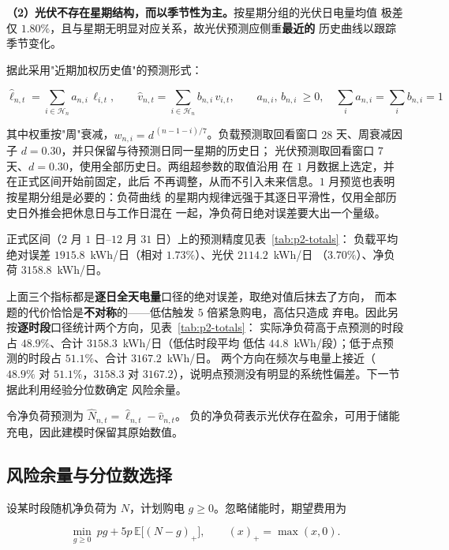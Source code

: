 \documentclass[withoutpreface,bwprint]{cumcmthesis}
\begin{document}
\textbf{（2）光伏不存在星期结构，而以季节性为主。}按星期分组的光伏日电量均值
极差仅 $1.80\%$，且与星期无明显对应关系，故光伏预测应侧重\textbf{最近的}
历史曲线以跟踪季节变化。

据此采用"近期加权历史值"的预测形式：

\begin{equation}
  \widehat{\ell}_{n,t}=\sum_{i\in\mathcal{H}_n}a_{n,i}\,\ell_{i,t},
  \qquad
  \widehat{v}_{n,t}=\sum_{i\in\mathcal{H}_n}b_{n,i}\,v_{i,t},
  \qquad
  a_{n,i},\,b_{n,i}\ \ge 0,\quad \sum_i a_{n,i}=\sum_i b_{n,i}=1
  \label{eq:p2-forecast}
\end{equation}

其中权重按"周"衰减，$w_{n,i}=d^{\,(n-1-i)/7}$。负载预测取回看窗口
$28$ 天、周衰减因子 $d=0.30$，并只保留与待预测日同一星期的历史日；
光伏预测取回看窗口 $7$ 天、$d=0.30$，使用全部历史日。两组超参数的取值沿用
在 $1$ 月数据上选定，并在正式区间开始前固定，此后
不再调整，从而不引入未来信息。$1$ 月预览也表明按星期分组是必要的：负荷曲线
的星期内规律远强于其逐日平滑性，仅用全部历史日外推会把休息日与工作日混在
一起，净负荷日绝对误差要大出一个量级。

正式区间（$2$ 月 $1$ 日--$12$ 月 $31$ 日）上的预测精度见表~\ref{tab:p2-totals}：
负载平均绝对误差 $1915.8$~kWh/日（相对 $1.73\%$）、光伏 $2114.2$~kWh/日
（$3.70\%$）、净负荷 $3158.8$~kWh/日。

上面三个指标都是\textbf{逐日全天电量}口径的绝对误差，取绝对值后抹去了方向，
而本题的代价恰恰是\textbf{不对称}的——低估触发 $5$ 倍紧急购电，高估只造成
弃电。因此另按\textbf{逐时段}口径统计两个方向，见表~\ref{tab:p2-totals}：
实际净负荷高于点预测的时段占 $48.9\%$、合计 $3158.3$~kWh/日（低估时段平均
低估 $44.8$~kWh/段）；低于点预测的时段占 $51.1\%$、合计 $3167.2$~kWh/日。
两个方向在频次与电量上接近（$48.9\%$ 对 $51.1\%$，$3158.3$ 对
$3167.2$），说明点预测没有明显的系统性偏差。下一节据此利用经验分位数确定
风险余量。

令净负荷预测为 $\widehat N_{n,t}=\widehat\ell_{n,t}-\widehat v_{n,t}$。
负的净负荷表示光伏存在盈余，可用于储能充电，因此建模时保留其原始数值。

\subsection{风险余量与分位数选择}

设某时段随机净负荷为 $N$，计划购电 $g\ge 0$。忽略储能时，期望费用为

\begin{equation}
  \min_{g\ge0}\ pg+5p\,\mathbb{E}\bigl[(N-g)_+\bigr],
  \qquad (x)_+=\max(x,0).
  \label{eq:p2-newsvendor}
\end{equation}
\end{document}
